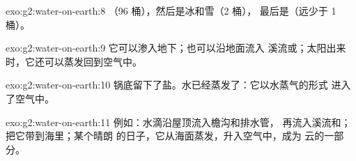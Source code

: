 \begin{solution}{exo:g2:water-on-earth:8}
（96 桶），然后是冰和雪（2 桶），
最后是（远少于 1 桶）。
\end{solution}

\begin{solution}{exo:g2:water-on-earth:9}
它可以渗入地下；也可以沿地面流入
溪流或；太阳出来时，它还可以蒸发回到空气中。
\end{solution}

\begin{solution}{exo:g2:water-on-earth:10}
锅底留下了盐。水已经蒸发了：它以水蒸气的形式
进入了空气中。
\end{solution}

\begin{solution}{exo:g2:water-on-earth:11}
例如：水滴沿屋顶流入檐沟和排水管，
再流入溪流和；把它带到海里；某个晴朗
的日子，它从海面蒸发，升入空气中，成为
云的一部分。
\end{solution}

